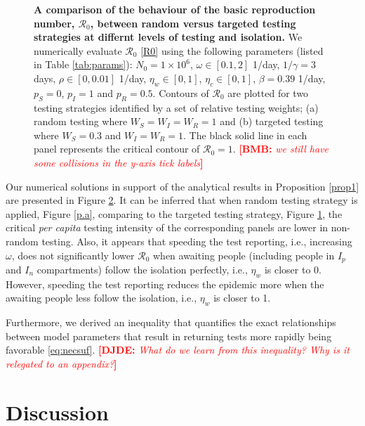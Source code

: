 \documentclass[12pt]{article}
\newcommand{\percap}{\emph{per capita}\xspace}
\newcommand{\Rnum}{\mathcal{R}_0}
\newcommand{\comment}{\showcomment}
\newcommand{\showcomment}[3]{\textcolor{#1}{\textbf{[#2: }\textsl{#3}\textbf{]}}}
\newcommand{\david}[1]{\comment{red}{DJDE}{#1}}
\newcommand{\bmb}[1]{\comment{red}{BMB}{#1}}
\theoremstyle{definition} %
\begin{document}
\begin{figure}[h!]
\begin{subfigure}[t]{.45\textwidth}
\caption{}\label{p.b}
\end{subfigure}
\caption{
{\bf A comparison of the behaviour of the basic reproduction number, $\Rnum$, between random versus targeted testing strategies at differnt levels of testing and isolation.}
We numerically evaluate $\Rnum$ \eqref{R0} using the following parameters (listed in Table \ref{tab:params}):
$N_0=1 \times 10^6$, $\omega \in [0.1,2]$ 1/day, $1/\gamma= 3$ days, $\rho \in [0,0.01]$ 1/day, $\eta_w \in [0,1]$, $\eta_c \in [0,1]$, $\beta=0.39$ 1/day, $p_S=0$, $p_I=1$ and $p_R=0.5$. Contours of $\Rnum$ are plotted for two testing strategies identified by a set of relative testing weights; (a) random testing where $W_S=W_I=W_R=1$ and (b) targeted testing where $W_S=0.3$ and $W_I=W_R=1$. The black solid line in each panel represents the critical contour of $\Rnum=1$. \bmb{we still have some collisions in the y-axis tick labels}}
\label{pan}
\end{figure}

Our numerical solutions in support of the analytical results in Proposition \ref{prop1} are presented in Figure \ref{pan}. It can be inferred that when random testing strategy is applied, Figure \ref{p.a}, comparing to the targeted testing strategy, Figure \ref{p.b}, the critical \percap testing intensity of the corresponding panels are lower in non-random testing. Also, it appears that speeding the test reporting, i.e., increasing $\omega$, does not significantly lower $\Rnum$ when awaiting people (including people in $I_p$ and $I_n$ compartments) follow the isolation perfectly, i.e., $\eta_w$ is closer to 0. However, speeding the test reporting reduces the epidemic more when the awaiting people less follow the isolation, i.e., $\eta_w$ is closer to 1. 

Furthermore, we derived an inequality that quantifies the exact relationships between model parameters that result in returning tests more rapidly being favorable \eqref{eq:necsuf}.
\david{What do we learn from this inequality?  Why is it relegated to an appendix?}

\section{Discussion}
\end{document}
